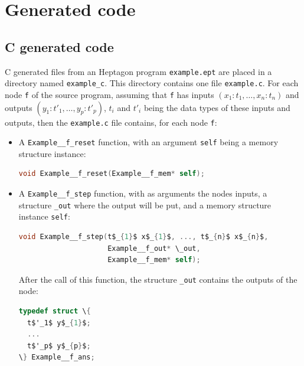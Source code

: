 \documentclass[a4paper]{article}
\begin{document}
\clearpage
\appendix

\section{Generated code}
\label{sec:app-generated-code}

\subsection{C generated code}
\label{sec:c-generated-code}

C generated files from an Heptagon program \texttt{example.ept} are placed in a
directory named \texttt{example\_c}. This directory contains one file
\texttt{example.c}. For each node \texttt{f} of the source program, assuming
that \texttt{f} has inputs $(x_1:t_1,\ldots,x_n:t_n)$ and outputs
$(y_1:t'_1,\ldots,y_p:t'_p)$, $t_i$ and $t'_i$ being the data types of these
inputs and outputs, then the \texttt{example.c} file contains, for each node
\texttt{f}:

\begin{itemize}
\item A \texttt{Example\_\_f\_reset} function, with an argument \texttt{self} being a
  memory structure instance:

\begin{lstlisting}[language=C]
void Example__f_reset(Example__f_mem* self);
\end{lstlisting}

\item A \texttt{Example\_\_f\_step} function, with as arguments the nodes inputs, a
  structure \texttt{\_out} where the output will be put, and a memory structure
  instance \texttt{self}:

\begin{lstlisting}[language=C]
void Example__f_step(t$_{1}$ x$_{1}$, ..., t$_{n}$ x$_{n}$,
                     Example__f_out* \_out,
                     Example__f_mem* self);
\end{lstlisting}

After the call of this function, the structure \texttt{\_out} contains the
outputs of the node:
\begin{lstlisting}[language=C]
typedef struct \{
  t$'_1$ y$_{1}$;
  ...
  t$'_p$ y$_{p}$;
\} Example__f_ans;
\end{lstlisting}
\end{itemize}
\end{document}
